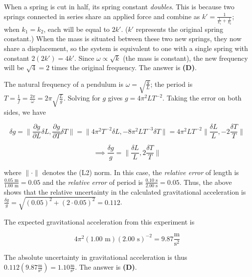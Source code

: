 \documentclass[12pt]{article}
\begin{document}
\vspace{2 \baselineskip}



When a spring is cut in half, its spring constant \textit{doubles}. This is because two springs connected in series share an applied force and combine as $k' = \frac{1}{\frac{1}{k_1} + \frac{1}{k_2}}$; when $k_1 = k_2$, each will be equal to $2 k'$. ($k'$ represents the original spring constant.) When the mass is situated between these two new springs, they now share a displacement, so the system is equivalent to one with a single spring with constant $2 (2 k') = 4 k'$. Since $\omega \propto \sqrt{k}$ (the mass is constant), the new frequency will be $\sqrt{4} = 2$ times the original frequency. The answer is \textbf{(D)}.


\vspace{2 \baselineskip}



The natural frequency of a pendulum is $\omega = \sqrt{\frac{g}{L}}$; the period is $T = \frac{1}{f} = \frac{2 \pi}{\omega} = 2 \pi \sqrt{\frac{L}{g}}$. Solving for $g$ gives $g = 4 \pi^2 L T^{-2}$. Taking the error on both sides, we have

$$\delta g = \lVert \frac{\partial g}{\partial L} \delta L, \frac{\partial g}{\partial T} \delta T \rVert = \lVert 4 \pi^2 T^{-2} \delta L, -8 \pi^2 L T^{-3} \delta T \rVert = 4 \pi^2 L T^{-2} \lVert \frac{\delta L}{L}, -2 \frac{\delta T}{T} \rVert$$

$$\implies \frac{\delta g}{g} = \lVert \frac{\delta L}{L}, 2 \frac{\delta T}{T} \rVert$$

where $\lVert \cdot \rVert$ denotes the (L2) norm. In this case, the \textit{relative error} of length is $\frac{0.05 \text{ m}}{1.00 \text{ m}} = 0.05$ and the \textit{relative error} of period is $\frac{0.10 \text{ s}}{2.00 \text{ s}} = 0.05$. Thus, the above shows that the relative uncertainty in the calculated gravitational acceleration is $\frac{\delta g}{g} = \sqrt{(0.05)^2 + (2 \cdot 0.05)^2} = 0.112$.

The expected gravitational acceleration from this experiment is

$$4 \pi^2 (1.00 \text{ m}) (2.00 \text{ s})^{-2} = 9.87 \frac{\text{m}}{\text{s}^2}$$

The absolute uncertainty in gravitational acceleration is thus $0.112 \left( 9.87 \frac{\text{m}}{\text{s}^2} \right) = 1.10 \frac{\text{m}}{\text{s}^2}$. The answer is \textbf{(D)}.
\end{document}
